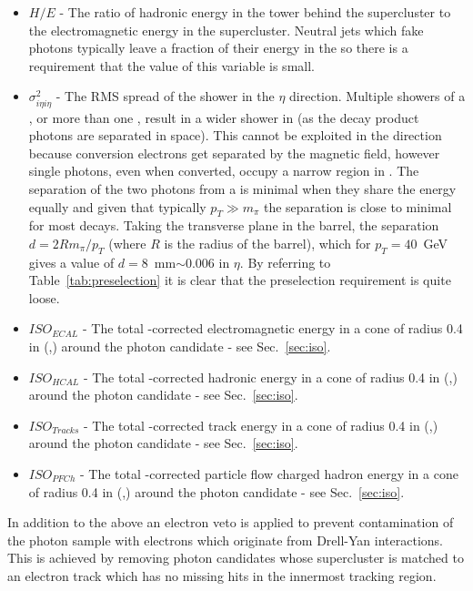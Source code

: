 \begin{itemize}
  \item $H/E$ - The ratio of hadronic energy in the \HCAL tower behind the supercluster to the electromagnetic energy in the supercluster. Neutral jets which fake photons typically leave a fraction of their energy in the \HCAL so there is a requirement that the value of this variable is small.
  \item $\sigma^{2}_{i\eta i\eta}$ - The RMS spread of the shower in the $\eta$ direction. Multiple showers of a \pizero, or more than one \pizero, result in a wider shower in \eta (as the \pizero decay product photons are separated in space). This cannot be exploited in the \phi direction because conversion electrons get separated by the magnetic field, however single photons, even when converted, occupy a narrow region in \eta. The separation of the two photons from a \pizero is minimal when they share the energy equally and given that typically $p_{T}\gg m_{\pi}$ the separation is close to minimal for most \pizero decays. Taking the transverse plane in the barrel, the separation $d=2Rm_{\pi}/p_{T}$ (where $R$ is the radius of the barrel), which for $p_{T}=40$~GeV gives a value of $d=$8~mm$\sim0.006$ in $\eta$. By referring to Table~\ref{tab:preselection} it is clear that the preselection requirement is quite loose.
  \item $ISO_{ECAL}$ - The total \rho-corrected electromagnetic energy in a cone of radius 0.4 in (\eta,\phi) around the photon candidate - see Sec.~\ref{sec:iso}.
  \item $ISO_{HCAL}$ - The total \rho-corrected hadronic energy in a cone of radius 0.4 in (\eta,\phi) around the photon candidate - see Sec.~\ref{sec:iso}.
  \item $ISO_{Tracks}$ - The total \rho-corrected track energy in a cone of radius 0.4 in (\eta,\phi) around the photon candidate - see Sec.~\ref{sec:iso}.
  \item $ISO_{PFCh}$ - The total \rho-corrected particle flow charged hadron energy in a cone of radius 0.4 in (\eta,\phi) around the photon candidate - see Sec.~\ref{sec:iso}.
\end{itemize}

In addition to the above an electron veto is applied to prevent contamination of the photon sample with electrons which originate from Drell-Yan interactions. This is achieved by removing photon candidates whose supercluster is matched to an electron track which has no missing hits in the innermost tracking region.


